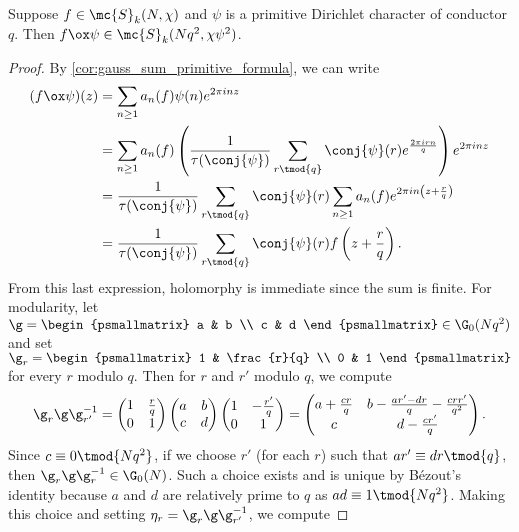    \begin{proposition}\label{prop:twisted_holomorphic_forms_primitive}
      Suppose $f \in \mc{S}_{k}(N,\chi)$ and $\psi$ is a primitive Dirichlet character of conductor $q$. Then $f \ox \psi \in \mc{S}_{k}(Nq^{2},\chi\psi^{2})$.
    \end{proposition}
    \begin{proof}
      By \cref{cor:gauss_sum_primitive_formula}, we can write
      \begin{align*}
        (f \ox \psi)(z) &= \sum_{n \ge 1}a_{n}(f)\psi(n)e^{2\pi inz} \\
        &= \sum_{n \ge 1}a_{n}(f)\left(\frac{1}{\tau(\conj{\psi})}\sum_{r \tmod{q}}\conj{\psi}(r)e^{\frac{2\pi irn}{q}}\right)e^{2\pi inz} \\
        &= \frac{1}{\tau(\conj{\psi})}\sum_{r \tmod{q}}\conj{\psi}(r)\sum_{n \ge 1}a_{n}(f)e^{2\pi in\left(z+\frac{r}{q}\right)} \\
        &= \frac{1}{\tau(\conj{\psi})}\sum_{r \tmod{q}}\conj{\psi}(r)f\left(z+\frac{r}{q}\right).
      \end{align*}
      From this last expression, holomorphy is immediate since the sum is finite. For modularity, let $\g = \begin{psmallmatrix} a & b \\ c & d \end{psmallmatrix} \in \G_{0}(Nq^{2})$ and set $\g_{r} = \begin{psmallmatrix} 1 & \frac{r}{q} \\ 0 & 1 \end{psmallmatrix}$ for every $r$ modulo $q$. Then for $r$ and $r'$ modulo $q$, we compute
      \[
        \g_{r}\g\g_{r'}^{-1} = \begin{pmatrix} 1 & \frac{r}{q} \\ 0 & 1 \end{pmatrix}\begin{pmatrix} a & b \\ c & d \end{pmatrix}\begin{pmatrix} 1 & -\frac{r'}{q} \\ 0 & 1 \end{pmatrix} = \begin{pmatrix} a+\frac{cr}{q} & b-\frac{ar'-dr}{q}-\frac{crr'}{q^{2}} \\ c & d-\frac{cr'}{q} \end{pmatrix}.
      \]
      Since $c \equiv 0 \tmod{Nq^{2}}$, if we choose $r'$ (for each $r$) such that $ar' \equiv dr \tmod{q}$, then $\g_{r}\g\g_{r}^{-1} \in \G_{0}(N)$. Such a choice exists and is unique by B\'ezout's identity because $a$ and $d$ are relatively prime to $q$ as $ad \equiv 1 \tmod{Nq^{2}}$. Making this choice and setting $\eta_{r} = \g_{r}\g\g_{r'}^{-1}$, we compute

\end{proof}
